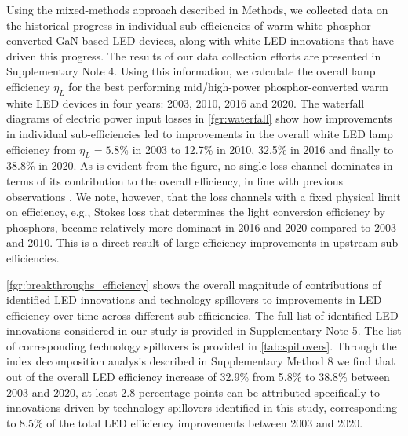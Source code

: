 \documentclass[parskip=full]{article}
\begin{document}
Using the mixed-methods approach described in Methods, we collected data on the historical progress in individual sub-efficiencies of warm white phosphor-converted GaN-based LED devices, along with white LED innovations that have driven this progress. The results of our data collection efforts are presented in Supplementary Note 4. Using this information, we calculate the overall lamp efficiency $\eta_L$ for the best performing mid/high-power phosphor-converted warm white LED devices in four years: 2003, 2010, 2016 and 2020. The waterfall diagrams of electric power input losses in \cref{fgr:waterfall} show how improvements in individual sub-efficiencies led to improvements in the overall white LED lamp efficiency from $\eta_L=5.8\%$ in 2003 to 12.7\% in 2010, 32.5\% in 2016 and finally to 38.8\% in 2020. As is evident from the figure, no single loss channel dominates in terms of its contribution to the overall efficiency, in line with previous observations \cite{tsao2010solid}. We note, however, that the loss channels with a fixed physical limit on efficiency, e.g., Stokes loss that determines the light conversion efficiency by phosphors, became relatively more dominant in 2016 and 2020 compared to 2003 and 2010.  This is a direct result of large efficiency improvements in upstream sub-efficiencies.

\cref{fgr:breakthroughs_efficiency} shows the overall magnitude of contributions of identified LED innovations and technology spillovers to improvements in LED efficiency over time across different sub-efficiencies. The full list of identified LED innovations considered in our study is provided in Supplementary Note 5. The list of corresponding technology spillovers is provided in \cref{tab:spillovers}. Through the index decomposition analysis described in Supplementary Method 8 we find that out of the overall LED efficiency increase of 32.9\% from 5.8\% to 38.8\% between 2003 and 2020, at least 2.8 percentage points can be attributed specifically to innovations driven by technology spillovers identified in this study, corresponding to 8.5\% of the total LED efficiency improvements between 2003 and 2020.
\end{document}
